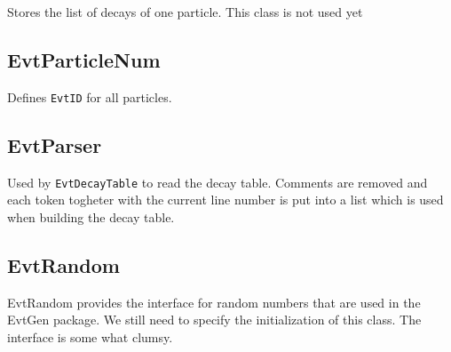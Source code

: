 Stores the list of decays of one particle. This class is not used yet

\subsection{EvtParticleNum}

Defines {\tt EvtID} for all particles.

\subsection{EvtParser}

Used by {\tt EvtDecayTable} to read the decay table. Comments are 
removed and each token togheter with the current line number is put into
a list which is used when building the decay table.



\subsection{EvtRandom}

EvtRandom provides the interface for random numbers that are used in
the EvtGen package. We still need to specify the initialization of this
class. The interface is some what clumsy.

